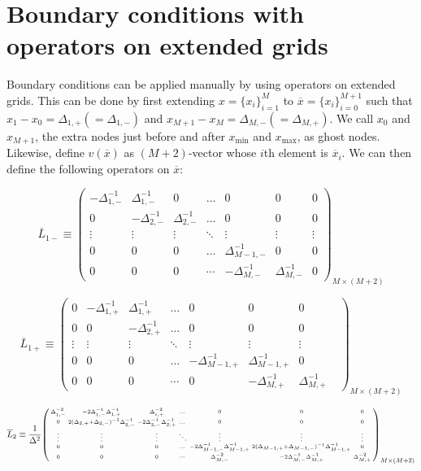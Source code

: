 \documentclass[11pt]{article}
\newenvironment{psmallmatrix}
{\left(\begin{smallmatrix}}
	{\end{smallmatrix}\right)}
\begin{document}
\section{Boundary conditions with operators on extended grids}
Boundary conditions can be applied manually by using operators on extended grids. This can be done by first extending $x = \{x_i\}_{i=1}^M$ to $ \overline{x} = \{x_i\}_{i=0}^{M+1}$ such that $x_1 - x_0 = \Delta_{1,+} (= \Delta_{1,-})$ and $x_{M+1} - x_M = \Delta_{M,-} (= \Delta_{M,+})$. We call $x_0$ and $x_{M+1}$, the extra nodes just before and after $x_{\min}$ and $x_{\max}$, as ghost nodes. Likewise, define $v(\overline{x})$ as $(M+2)$-vector whose $i$th element is $\overline {x}_i$. We can then define the following operators on $\overline{x}$:


\begin{equation}\label{eq:L-1-minus-extended}
\overline{L}_{1-} \equiv\begin{pmatrix}
-\Delta_{1,-}^{-1}&\Delta_{1,-}^{-1}&0&\dots&0&0&0\\
0&-\Delta_{2,-}^{-1}&\Delta_{2,-}^{-1}&\dots&0&0&0\\
\vdots&\vdots&\vdots&\ddots&\vdots&\vdots&\vdots\\
0&0&0&\dots&\Delta_{M-1,-}^{-1}&0&0\\
0&0&0&\cdots&-\Delta_{M,-}^{-1}&\Delta_{M,-}^{-1}&0
\end{pmatrix}_{M\times (M+2)}
\end{equation}

\begin{equation}\label{eq:L-1-plus-extended}
\overline{L}_{1+} \equiv \begin{pmatrix}
0&-\Delta_{1,+}^{-1}&\Delta_{1,+}^{-1}&\dots&0&0&0\\
0&0&-\Delta_{2,+}^{-1}&\dots&0&0&0\\
\vdots&\vdots&\vdots&\ddots&\vdots&\vdots&\vdots\\
0&0&0&\dots&-\Delta_{M-1,+}^{-1}&\Delta_{M-1,+}^{-1}&0\\
0&0&0&\cdots&0&-\Delta_{M,+}^{-1}&\Delta_{M,+}^{-1}&
\end{pmatrix}_{M\times (M+2)}
\end{equation}


\begin{equation}\label{eq:L-2-extended} \small
\overline{L}_2 \equiv \frac{1}{\Delta^2}\begin{psmallmatrix}
\Delta_{1,-}^{-2} &-2\Delta_{1,-}^{-1} \Delta_{1,+}^{-1}  & \Delta_{i,+}^{-2}&\dots&0&0&0\\
0&2(\Delta_{2,+}+\Delta_{2,-})^{-1} \Delta_{2,-}^{-1} &-2\Delta_{2,-}^{-1} \Delta_{2,+}^{-1} &\dots&0&0&0\\
\vdots&\vdots&\vdots&\ddots&\vdots&\vdots&\vdots\\
0&0&0&\dots&-2\Delta_{M-1,-}^{-1} \Delta_{M-1,+}^{-1}  & 2 (\Delta_{M-1,+}+\Delta_{M-1,-})^{-1} \Delta_{M-1,+}^{-1}&0\\
0&0&0&\cdots&\Delta_{M,-}^{-2} &-2\Delta_{M,-}^{-1} \Delta_{M,+}^{-1}  & \Delta_{M,+}^{-2}
\end{psmallmatrix}_{M\times (M+2)}
\end{equation}
\end{document}
